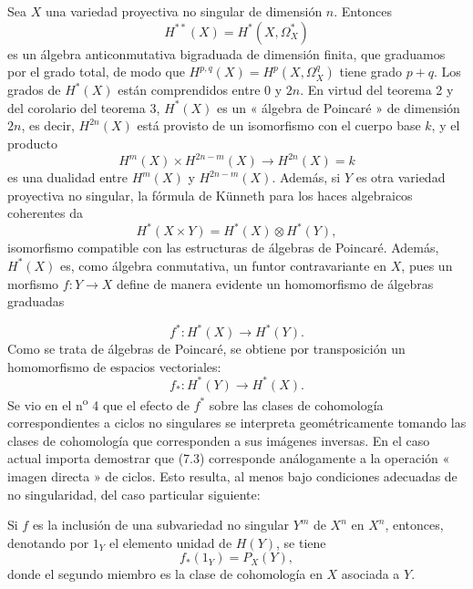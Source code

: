 
Sea $X$ una variedad proyectiva no singular de dimensión $n$. Entonces
\[
  H^{**}(X)=H^{*}(X,\Omega_X^{*})
\]
es un álgebra anticonmutativa bigraduada de dimensión finita, que graduamos
por el grado total, de modo que $H^{p,q}(X)=H^{p}(X,\Omega_X^{q})$ tiene grado
$p+q$. Los grados de $H^{*}(X)$ están comprendidos entre $0$ y $2n$. En virtud del
teorema 2 y del corolario del teorema 3, $H^{*}(X)$ es un « álgebra de
Poincaré » de dimensión $2n$, es decir, $H^{2n}(X)$ está provisto de un isomorfismo con
el cuerpo base $k$, y el producto
\[
  H^{m}(X)\times H^{2n-m}(X)\longrightarrow H^{2n}(X)=k
\]
es una dualidad entre $H^{m}(X)$ y $H^{2n-m}(X)$. Además, si $Y$ es otra
variedad proyectiva no singular, la fórmula de Künneth para los
haces algebraicos coherentes da
\begin{equation}\tag{7.1}
  H^{*}(X\times Y)=H^{*}(X)\otimes H^{*}(Y),
\end{equation}
isomorfismo compatible con las estructuras de álgebras de Poincaré. Además,
$H^{*}(X)$ es, como álgebra conmutativa, un funtor contravariante en
$X$, pues un morfismo $f:Y\longrightarrow X$ define de manera evidente un
homomorfismo de álgebras graduadas

\begin{equation}\tag{7.2}
  f^{*}:H^{*}(X)\longrightarrow H^{*}(Y).
\end{equation}
Como se trata de álgebras de Poincaré, se obtiene por transposición un
homomorfismo de espacios vectoriales:
\begin{equation}\tag{7.3}
  f_{*}:H^{*}(Y)\longrightarrow H^{*}(X).
\end{equation}
Se vio en el n\textsuperscript{o} 4 que el efecto de $f^{*}$ sobre las clases de
cohomología correspondientes a ciclos no singulares se interpreta
geométricamente tomando las clases de cohomología que corresponden a sus
imágenes inversas. En el caso actual importa demostrar que (7.3) corresponde
análogamente a la operación « imagen directa » de ciclos. Esto resulta, al menos bajo
condiciones adecuadas de no singularidad, del caso particular siguiente:

 Si $f$ es la inclusión de una subvariedad no
singular $Y^{m}$ de $X^{n}$ en $X^{n}$, entonces, denotando por $1_Y$
el elemento unidad de $H(Y)$, se tiene
\begin{equation}\tag{7.4}
  f_{*}(1_Y)=P_X(Y),
\end{equation}
donde el segundo miembro es la clase de cohomología en $X$ asociada a $Y$.

